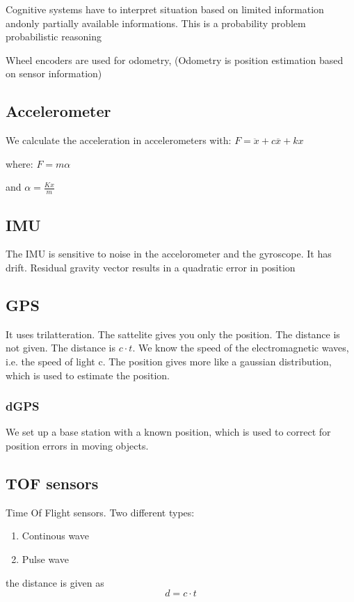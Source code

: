 \documentclass{article}
\begin{document}
Cognitive systems have to interpret situation based on limited information andonly partially available informations. This is a probability problem ~ probabilistic reasoning

Wheel encoders are used for odometry, (Odometry is position estimation based on sensor information) 


\subsection{Accelerometer}
We calculate the acceleration in accelerometers with:
$F = \ddot{x} + c \overline{x} + kx $

where: $F = m \alpha$

and  $\alpha = \frac{Kx}{m}$


\subsection{IMU}
The IMU is sensitive to noise in the accelorometer and the gyroscope. 
It has drift. 
Residual gravity vector results in a quadratic error in position


\subsection{GPS} 
It uses trilatteration.  
The sattelite gives you only the position. The distance is not given. The distance is $c \cdot t$. We know the speed of the electromagnetic waves, i.e. the speed of light c. The position gives more like a gaussian distribution, which is used to estimate the position. 

\subsubsection{dGPS}
We set up a base station with a known position, which is used to correct for position errors in moving objects. 

\subsection{TOF sensors}
Time Of Flight sensors. Two different types:
\begin{enumerate}
	\item Continous wave
	\item Pulse wave
\end{enumerate}

the distance is given as 
\[
d = c \cdot t
\] 
\end{document}
